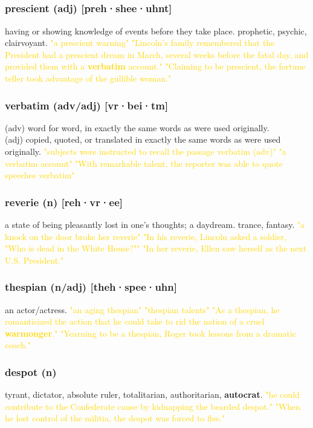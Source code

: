 \documentclass{proc}
\begin{document}
	\newpage
	\subsection{}
	\subsubsection{\textcolor{brickred}{prescient} (adj) [preh·shee·uhnt]}
	having or showing knowledge of events before they take place. prophetic, psychic, clairvoyant.
	\textcolor{gold}{"a prescient warning" "Lincoln's family remembered that the President had a prescient dream in March, several weeks before the fatal day, and provided them with a \textbf{verbatim} account." "Claiming to be prescient, the fortune teller took advantage of the gullible woman."}
	
	\subsubsection{\textcolor{brickred}{verbatim} (adv/adj) [vr·bei·tm]}
	(adv) word for word, in exactly the same words as were used originally.\\
	(adj) copied, quoted, or translated in exactly the same words as were used originally.
	\textcolor{gold}{"subjects were instructed to recall the passage verbatim (adv)" "a verbatim account" "With remarkable talent, the reporter was able to quote speeches verbatim"}
	
	\subsubsection{\textcolor{brickred}{reverie} (n) [reh·vr·ee]}
	a state of being pleasantly lost in one's thoughts; a daydream. trance, fantasy.
	\textcolor{gold}{"a knock on the door broke her reverie" "In his reverie, Lincoln asked a soldier, "Who is dead in the White House?"" "In her reverie, Ellen saw herself as the next U.S. President."}
	
	\subsubsection{\textcolor{brickred}{thespian} (n/adj) [theh·spee·uhn]}
	an actor/actress.
	\textcolor{gold}{"an aging thespian" "thespian talents" "As a thespian, he romanticized the action that he could take to rid the nation of a cruel \textbf{warmonger}." "Yearning to be a thespian, Roger took lessons from a dramatic coach."}
	
	\subsubsection{\textcolor{brickred}{despot} (n)}
	tyrant, dictator, absolute ruler, totalitarian, authoritarian, \textbf{autocrat}.
	\textcolor{gold}{"he could contribute to the Confederate cause by kidnapping the bearded despot." "When he lost control of the militia, the despot was forced to flee."}
	
\end{document}
